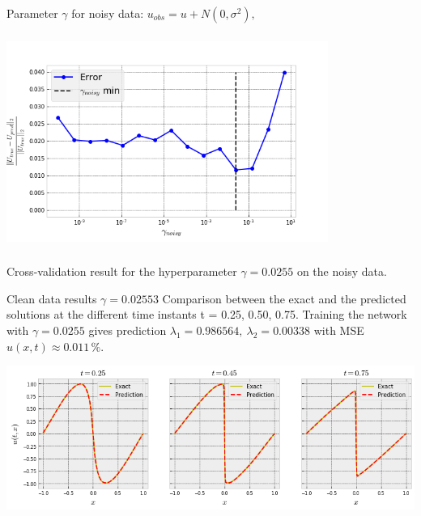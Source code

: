\documentclass{beamer}
\def\\{}%
\begin{document}
\begin{frame}

Parameter $\gamma$ for noisy data: $u_{obs} = u + N(0, \sigma^2),$

\centering
\includegraphics[width=10.5cm, height=7cm]{images/burgers-cross_val_gamma_noisy.png}\\

Cross-validation result for the hyperparameter $\gamma = 0.0255$ on the noisy data.

\end{frame}

\begin{frame}{Clean data results $\gamma=0.02553$}
Comparison between the exact and the predicted solutions at the different time instants t = 0.25, 0.50, 0.75. Training the network with $\gamma=0.0255$ gives prediction $\lambda_1 =
0.986564, ~ \lambda_2 = 0.00338$ with MSE $u(x, t) \approx 0.011 \,\%$.

\centering
\includegraphics[scale=0.415]{images/burgers-exact-predict.png}


\end{frame}
\end{document}

